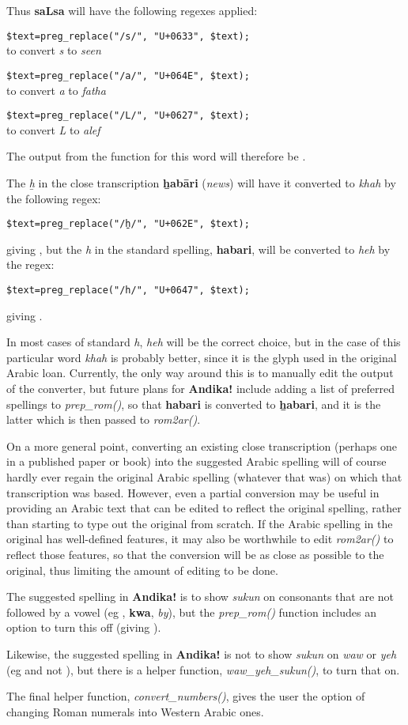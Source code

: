 Thus \textbf{saLsa} will have the following regexes applied:

\verb|$text=preg_replace("/s/", "U+0633", $text);|\\
to convert \textit{s} to \textit{seen}

\verb|$text=preg_replace("/a/", "U+064E", $text);|\\
to convert \textit{a} to \textit{fatha}

\verb|$text=preg_replace("/L/", "U+0627", $text);|\\
to convert \textit{L} to \textit{alef}

The output from the function for this word will therefore be .

The \textit{ẖ} in the close transcription \textbf{ẖabāri} (\textit{news}) will have it converted to \textit{khah} by the following regex:

\verb|$text=preg_replace("/ẖ/", "U+062E", $text);|

giving , but the \textit{h} in the standard spelling, \textbf{habari}, will be converted to \textit{heh} by the regex:

\verb|$text=preg_replace("/h/", "U+0647", $text);|

giving .

In most cases of standard \textit{h}, \textit{heh} will be the correct choice, but in the case of this particular word \textit{khah} is probably better, since it is the glyph used in the original Arabic loan.  Currently, the only way around this is to manually edit the output of the converter, but future plans for \textbf{Andika!} include adding a list of preferred spellings to \textit{prep\_rom()}, so that \textbf{habari} is converted to \textbf{ẖabari}, and it is the latter which is then passed to \textit{rom2ar()}.

On a more general point, converting an existing close transcription (perhaps one in a published paper or book) into the suggested Arabic spelling will of course hardly ever regain the original Arabic spelling (whatever that was) on which that transcription was based.  However, even a partial conversion may be useful in providing an Arabic text that can be edited to reflect the original spelling, rather than starting to type out the original from scratch.  If the Arabic spelling in the original has well-defined features, it may also be worthwhile to edit \textit{rom2ar()} to reflect those features, so that the conversion will be as close as possible to the original, thus limiting the amount of editing to be done.

The suggested spelling in \textbf{Andika!} is to show \textit{sukun} on consonants that are not followed by a vowel (eg , \textbf{kwa}, \textit{by}), but the \textit{prep\_rom()} function includes an option to turn this off (giving ).

Likewise, the suggested spelling in \textbf{Andika!} is not to show \textit{sukun} on \textit{waw} or \textit{yeh} (eg  and not ), but there is a helper function, \textit{waw\_yeh\_sukun()}, to turn that on.

The final helper function, \textit{convert\_numbers()}, gives the user the option of changing Roman numerals into Western Arabic ones.
